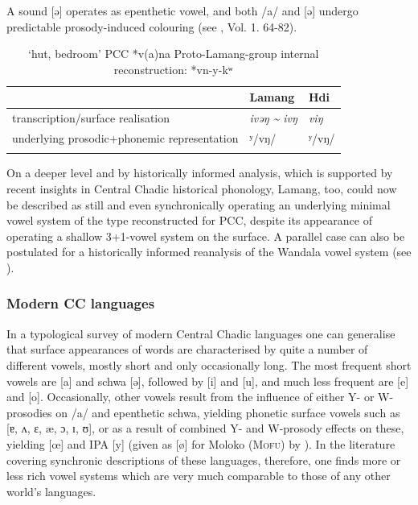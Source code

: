 \documentclass[output=paper]{langscibook}
\begin{document}
A sound [ə] operates as epenthetic vowel, and both /a/ and [ə] undergo predictable prosody-induced colouring (see \citealt{Wolff2015}, Vol. 1. 64-82). 

\begin{table}
\caption{‘hut, bedroom’ PCC *v(a)na
\newline
Proto-Lamang-group internal reconstruction: *vn-y-kʷ
}
\label{extab:wolff:11}
\begin{tabularx}{\textwidth}{Xll}
\lsptoprule
 & Lamang & Hdi\\
 \midrule
transcription/surface realisation & \textit{ivəŋ {\textasciitilde}} \textit{ivŋ} & {\itshape viŋ}\\
underlying prosodic+phonemic representation & ʸ/vŋ/ & ʸ/vŋ/\\
\lspbottomrule
\end{tabularx}
\end{table}

On a deeper level and by historically informed analysis, which is supported by recent insights in Central Chadic historical phonology, Lamang, too, could now be described as still and even synchronically operating an underlying minimal vowel system of the type reconstructed for PCC, despite its appearance of operating a shallow 3+1-vowel system on the surface. A parallel case can also be postulated for a historically informed reanalysis of the Wandala vowel system (see \citealt{WolffNaumann2004}).

\subsubsection{Modern CC languages}
\label{sec:Wolff:2.3.3}
In a typological survey of modern Central Chadic languages one can generalise that surface appearances of words are characterised by quite a number of different vowels, mostly short and only occasionally long. The most frequent short vowels are [a] and schwa [ə], followed by [i] and [u], and much less frequent are [e] and [o]. Occasionally, other vowels result from the influence of either Y- or W-prosodies on /a/ and epenthetic schwa, yielding phonetic surface vowels such as [ɐ, ʌ, ɛ, æ, ɔ, ɪ, ʊ], or as a result of combined Y- and W-prosody effects on these, yielding [œ] and IPA [y] (given as [ø] for Moloko (\textsc{Mofu}) by \citealt{FriesenEtAl2017}). In the literature covering synchronic descriptions of these languages, therefore, one finds more or less rich vowel systems which are very much comparable to those of any other world’s languages. 
\end{document}
